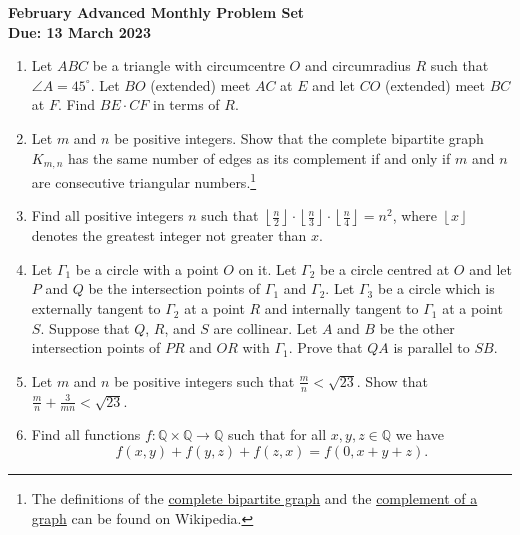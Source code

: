 \documentclass{article}
\newcommand*{\floor}[1]{\left\lfloor#1\right\rfloor}
\begin{document}
\thispagestyle{empty}

\begin{center}
  \textbf{\Large February Advanced Monthly Problem Set}
  \\ \vspace{1em}
  \textbf{\large Due: 13 March 2023}
\end{center}

\bigskip

\begin{enumerate}[itemsep=\fill]

\item %
Let $ABC$ be a triangle with circumcentre $O$ and circumradius $R$ such that $\angle A = 45^\circ$.
Let $BO$ (extended) meet $AC$ at $E$ and let $CO$ (extended) meet $BC$ at $F$.
Find $BE \cdot CF$ in terms of $R$.

 
\item %
Let $m$ and $n$ be positive integers.
Show that the complete bipartite graph $K_{m,n}$ has the same number of edges as its complement if and only if $m$ and $n$ are consecutive triangular numbers.\footnote{The definitions of the \href{https://en.wikipedia.org/wiki/Complete_bipartite_graph}{complete bipartite graph} and the \href{https://en.wikipedia.org/wiki/Complement_graph}{complement of a graph} can be found on Wikipedia.}


\item %
Find all positive integers $n$ such that $\displaystyle \floor{\frac{n}{2}} \cdot \floor{\frac{n}{3}} \cdot \floor{\frac{n}{4}} = n^2$, where $\floor{x}$ denotes the greatest integer not greater than $x$.


\item %
Let $\Gamma_1$ be a circle with a point $O$ on it.
Let $\Gamma_2$ be a circle centred at $O$ and let $P$ and $Q$ be the intersection points of $\Gamma_1$ and $\Gamma_2$.
Let $\Gamma_3$ be a circle which is externally tangent to $\Gamma_2$ at a point $R$ and internally tangent to $\Gamma_1$ at a point $S$.
Suppose that $Q$, $R$, and $S$ are collinear.
Let $A$ and $B$ be the other intersection points of $PR$ and $OR$ with $\Gamma_1$.
Prove that $QA$ is parallel to $SB$.


\item %
Let $m$ and $n$ be positive integers such that $\displaystyle \frac{m}{n} < \sqrt{23}$.
Show that $\displaystyle \frac{m}{n} +\frac{3}{mn} < \sqrt{23}$.


\item %
Find all functions $f : \mathbb{Q} \times \mathbb{Q} \to \mathbb{Q}$ such that for all $x, y, z \in \mathbb{Q}$ we have
\[ f(x,y) +f(y,z) +f(z,x) = f(0,x+y+z). \]



\end{enumerate}
\end{document}

